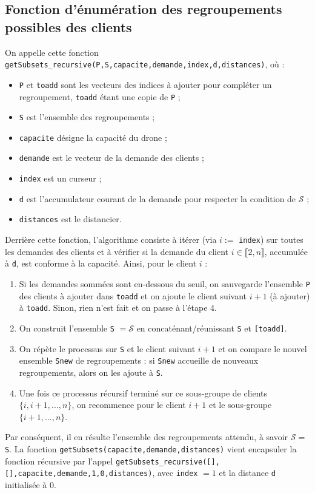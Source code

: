 \documentclass[french, 11pt, a4paper]{article} %
\newcommand{\Sc}{\mathcal{S}} %
\newcommand{\smb}{\smallbreak}
\begin{document}
\subsection{Fonction d'énumération des regroupements possibles des clients}
On appelle cette fonction \texttt{getSubsets\_recursive(P,S,capacite,demande,index,d,distances)},
où : \begin{itemize}
    \item \verb+P+ et \verb+toadd+ sont les vecteurs des indices à ajouter pour compléter un regroupement, \verb+toadd+ étant une copie de \verb+P+ ;
    \item \verb+S+ est l'ensemble des regroupements ;
    \item \verb+capacite+ désigne la capacité du drone ;
    \item \verb+demande+ est le vecteur de la demande des clients ;
    \item \verb+index+ est un curseur ;
    \item \verb+d+ est l'accumulateur courant de la demande pour respecter la condition de $\Sc$ ;
    \item \verb+distances+ est le distancier.
\end{itemize}

Derrière cette fonction, l'algorithme consiste à itérer (via $i:=$ \verb+index+) sur toutes les demandes des clients
et à vérifier si la demande du client $i \in \llbracket 2,n \rrbracket$, accumulée à \verb+d+, est conforme à la capacité. Ainsi,
pour le client $i$ : 
\begin{enumerate}
    \item Si les demandes sommées sont en-dessous du seuil, on sauvegarde l'ensemble \verb+P+ des clients à ajouter dans \verb+toadd+
    et on ajoute le client suivant $i+1$ (à ajouter) à \verb+toadd+. Sinon, rien n'est fait et on passe à l'étape 4.
    \item On construit l'ensemble \verb+S+ $= \Sc$ en concaténant/réunissant \verb+S+ et \verb+[toadd]+.
    \item On répète le processus sur \verb+S+ et le client suivant $i+1$ et on compare le nouvel ensemble \verb+Snew+
    de regroupements : si \verb+Snew+ accueille de nouveaux regroupements, alors on les ajoute à \verb+S+.
    \item Une fois ce processus récursif terminé sur ce sous-groupe de clients $\{i,i+1,...,n\}$, on recommence pour le client $i+1$ et le sous-groupe
$\{i+1,...,n\}$.
\end{enumerate}
\smb Par conséquent, il en résulte l'ensemble des regroupements attendu, à savoir $\Sc = $ \verb+S+.
\smb La fonction \texttt{getSubsets(capacite,demande,distances)} vient encapsuler la fonction récursive par l'appel
\texttt{getSubsets\_recursive([],[],capacite,demande,1,0,distances)}, avec \verb+index+ $=1$ et la distance \verb+d+ initialisée à $0$.
\end{document}
